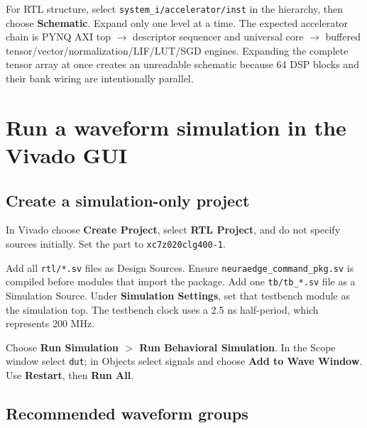 \documentclass[10pt]{article}
\begin{document}
For RTL structure, select \texttt{system\_i/accelerator/inst} in the hierarchy,
then choose \textbf{Schematic}. Expand only one level at a time. The expected
accelerator chain is PYNQ AXI top $\rightarrow$ descriptor sequencer and
universal core $\rightarrow$ buffered tensor/vector/normalization/LIF/LUT/SGD
engines. Expanding the complete tensor array at once creates an unreadable
schematic because 64 DSP blocks and their bank wiring are intentionally
parallel.

\section{Run a waveform simulation in the Vivado GUI}

\subsection{Create a simulation-only project}

In Vivado choose \textbf{Create Project}, select \textbf{RTL Project}, and do
not specify sources initially. Set the part to \texttt{xc7z020clg400-1}.

Add all \texttt{rtl/*.sv} files as Design Sources. Ensure
\texttt{neuraedge\_command\_pkg.sv} is compiled before modules that import the
package. Add one \texttt{tb/tb\_*.sv} file as a Simulation Source. Under
\textbf{Simulation Settings}, set that testbench module as the simulation top.
The testbench clock uses a 2.5 ns half-period, which represents 200 MHz.

Choose \textbf{Run Simulation $>$ Run Behavioral Simulation}. In the Scope
window select \texttt{dut}; in Objects select signals and choose
\textbf{Add to Wave Window}. Use \textbf{Restart}, then \textbf{Run All}.

\subsection{Recommended waveform groups}
\end{document}
